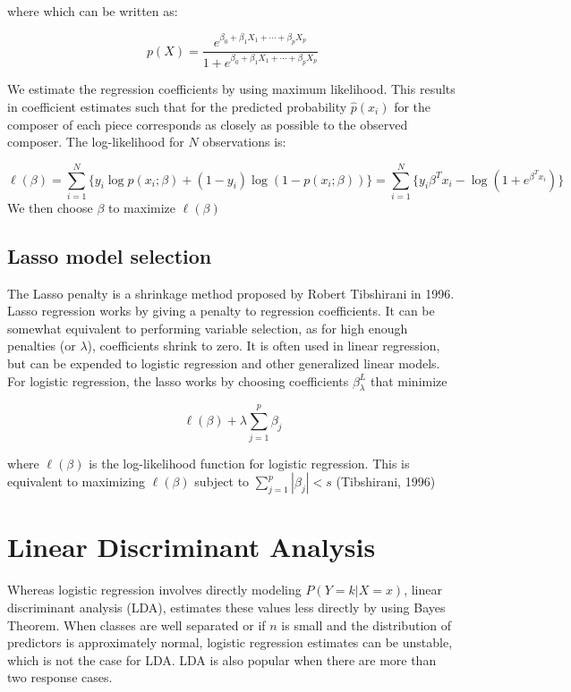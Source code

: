 \documentclass[12pt,twoside]{reedthesis}
\theoremstyle{definition}
\theoremstyle{definition}
\theoremstyle{definition}
\theoremstyle{remark}
\begin{document}
where which can be written as:

\[ p(X) = \frac{e^{\beta_0 + \beta_1X_1 + \cdots + \beta_pX_p}}{1 +e^{\beta_0 + \beta_1X_1 + \cdots + \beta_pX_p} }\]

We estimate the regression coefficients by using maximum likelihood.
This results in coefficient estimates such that for the predicted
probability \(\hat{p}(x_i)\) for the composer of each piece corresponds
as closely as possible to the observed composer. The log-likelihood for
\(N\) observations is:

\[ \ell(\beta) = \sum_{i = 1}^N \big\{y_i\log p(x_i;\beta) + (1-y_i)\log(1-p(x_i;\beta))\big\} = \sum_{i = 1}^N \big\{y_i\beta^Tx_i - \log(1 + e^{\beta^Tx_i})\big\}\]
We then choose \(\beta\) to maximize \(\ell(\beta)\)

\subsection{Lasso model selection}\label{lasso-model-selection}

The Lasso penalty is a shrinkage method proposed by Robert Tibshirani in
1996. Lasso regression works by giving a penalty to regression
coefficients. It can be somewhat equivalent to performing variable
selection, as for high enough penalties (or \(\lambda\)), coefficients
shrink to zero. It is often used in linear regression, but can be
expended to logistic regression and other generalized linear models. For
logistic regression, the lasso works by choosing coefficients
\(\beta_\lambda^L\) that minimize

\[ \ell(\beta) + \lambda \sum_{j = 1}^p \beta_j \]

where \(\ell(\beta)\) is the log-likelihood function for logistic
regression. This is equivalent to maximizing \(\ell(\beta)\) subject to
\(\sum_{j=1}^p|\beta_j| < s\) (Tibshirani, 1996)

\section{Linear Discriminant
Analysis}\label{linear-discriminant-analysis}

Whereas logistic regression involves directly modeling
\(P(Y = k | X =x)\), linear discriminant analysis (LDA), estimates these
values less directly by using Bayes Theorem. When classes are well
separated or if \(n\) is small and the distribution of predictors is
approximately normal, logistic regression estimates can be unstable,
which is not the case for LDA. LDA is also popular when there are more
than two response cases.
\end{document}

